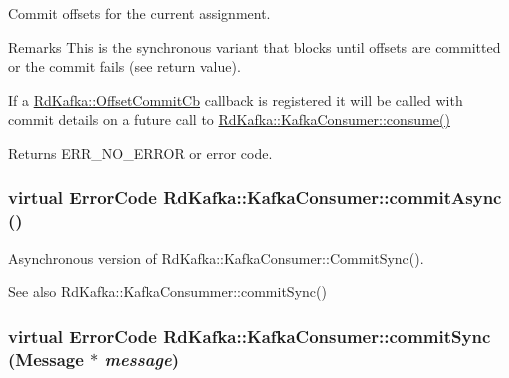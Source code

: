 Commit offsets for the current assignment. \begin{DoxyRemark}{Remarks}
This is the synchronous variant that blocks until offsets are committed or the commit fails (see return value).

If a \hyperlink{classRdKafka_1_1OffsetCommitCb}{RdKafka::OffsetCommitCb} callback is registered it will be called with commit details on a future call to \hyperlink{classRdKafka_1_1KafkaConsumer_a7dc106f1c3b99767a0930a9cf8cabf84}{RdKafka::KafkaConsumer::consume()}
\end{DoxyRemark}
\begin{DoxyReturn}{Returns}
ERR\_\-NO\_\-ERROR or error code. 
\end{DoxyReturn}
\hypertarget{classRdKafka_1_1KafkaConsumer_a6d68b1b8d21dc26499938cb6e529f928}{
\subsubsection[{commitAsync}]{\setlength{\rightskip}{0pt plus 5cm}virtual ErrorCode RdKafka::KafkaConsumer::commitAsync ()}}
\label{classRdKafka_1_1KafkaConsumer_a6d68b1b8d21dc26499938cb6e529f928}


Asynchronous version of RdKafka::KafkaConsumer::CommitSync(). \begin{DoxySeeAlso}{See also}
RdKafka::KafkaConsummer::commitSync() 
\end{DoxySeeAlso}
\hypertarget{classRdKafka_1_1KafkaConsumer_ac5d1b4fcadea749b774ab1cdd62de2d1}{
\subsubsection[{commitSync}]{\setlength{\rightskip}{0pt plus 5cm}virtual ErrorCode RdKafka::KafkaConsumer::commitSync ({\bf Message} $\ast$ {\em message})}}
\label{classRdKafka_1_1KafkaConsumer_ac5d1b4fcadea749b774ab1cdd62de2d1}


